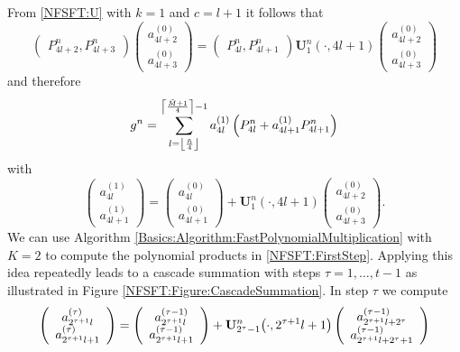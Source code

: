 From \eqref{NFSFT:U} with $k = 1$ and $c = l+1$ it follows that
$$
\left(\begin{array}{c}
  P_{4l+2}^{n}, 
  P_{4l+3}^{n}
\end{array}\right)
\left(\begin{array}{c}
  a_{4l+2}^{(0)}\\
  a_{4l+3}^{(0)} 
\end{array}\right)
=
\left(\begin{array}{c}
  P_{4l}^{n},
  P_{4l+1}^{n}
\end{array}\right)
{\mathbf{U}_{1}^{n}\left(\cdot,4l+1\right)}
\left(\begin{array}{c}
  a_{4l+2}^{(0)}\\
  a_{4l+3}^{(0)} 
\end{array}\right)
$$
and therefore
$$ g^n = \sum_{l = \left\lfloor\frac{\tilde{n}}{4}\right\rfloor}^{\left\lceil\frac{\tilde{M}+1}{4}\right\rceil-1} a_{4l}^{(1)} \left(P_{4l}^{n} + a_{4l+1}^{(1)} P_{4l+1}^{n}\right) $$
with
\begin{equation}
\label{NFSFT:FirstStep}
  \left(\begin{array}{c}
    a_{4l}^{(1)}\\
    a_{4l+1}^{(1)} 
  \end{array}\right)
  =
  \left(\begin{array}{c}
    a_{4l}^{(0)}\\
    a_{4l+1}^{(0)} 
  \end{array}\right)
  + {\mathbf{U}_{1}^{n}\left(\cdot,4l+1\right)}
  \left(\begin{array}{c}
    a_{4l+2}^{(0)}\\
    a_{4l+3}^{(0)} 
  \end{array}\right).
\end{equation}
We can use Algorithm \ref{Basics:Algorithm:FastPolynomialMultiplication} with $K=2$ to compute 
the polynomial products in \eqref{NFSFT:FirstStep}. Applying this idea repeatedly leads to a cascade 
summation with steps $\tau=1,\ldots,t-1$ as illustrated in Figure \ref{NFSFT:Figure:CascadeSummation}. 
In step $\tau$ we compute
\begin{equation}
  \label{NFSFT:GeneralStep}
  \left(\begin{array}{c}
    a_{2^{\tau+1}l}^{(\tau)}\\
    a_{2^{\tau+1}l+1}^{(\tau)} 
  \end{array}\right)
  =
  \left(\begin{array}{c}
    a_{2^{\tau+1}l}^{(\tau-1)}\\
    a_{2^{\tau+1}l+1}^{(\tau-1)} 
  \end{array}\right)
  + {\mathbf{U}_{2^{\tau}-1}^{n}{\hspace{-0.4ex}}\left(\cdot,2^{\tau+1}l+1\right)}
  \left(\begin{array}{c}
    a_{2^{\tau+1}l+2^{\tau}}^{(\tau-1)}\\
    a_{2^{\tau+1}l+2^{\tau}+1}^{(\tau-1)} 
  \end{array}\right)
\end{equation}
